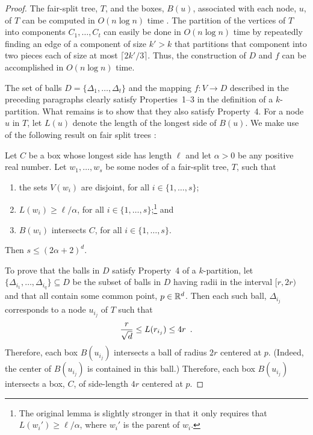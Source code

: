 \documentclass{patmorin}
\begin{document}
\begin{proof}
  The fair-split tree, $T$, and the boxes, $B(u)$, associated
  with each node, $u$, of $T$ can be computed in $O(n\log n)$ time
  \cite{callahan.kosaraju:decomposition}.  The partition of the vertices
  of $T$ into components $C_1,\ldots,C_t$ can easily be done in $O(n\log
  n)$ time by repeatedly finding an edge of a component of size $k'>k$
  that partitions that component into two pieces each of size at most
  $\lceil 2k'/3\rceil$.  Thus, the construction of $D$ and $f$ can be
  accomplished in $O(n\log n)$ time.

  The set of balls $D=\{\Delta_1,\ldots,\Delta_t\}$ and the
  mapping $f:V\to D$ described in the preceding paragraphs clearly
  satisfy Properties~1--3 in the definition of a $k$-partition.
  What remains is to show that they also satisfy Property~4. For a
  node $u$ in $T$, let $L(u)$ denote the length of the longest side
  of $B(u)$.  We make use of the following result on fair split trees
  \cite[Lemma~9.4.3]{narasimhan.smid:geometric}:

  \begin{lem}
     Let $C$ be a box whose longest side has length $\ell$ and let
     $\alpha >0$ be any positive real number.  Let $w_1,\ldots,w_s$
     be some nodes of a fair-split tree, $T$, such that
     \begin{enumerate}
       \item the sets $V(w_i)$ are disjoint, for all $i\in\{1,\ldots,s\}$;
       \item $L(w_i)\ge \ell/\alpha$, for all
          $i\in\{1,\ldots,s\}$;\footnote{The original lemma
          \cite[Lemma~9.4.3]{narasimhan.smid:geometric} is slightly
          stronger in that it only requires that $L(w_i')\ge \ell/\alpha$,
          where $w_i'$ is the parent of $w_i$.} and
       \item $B(w_i)$ intersects $C$, for all $i\in\{1,\ldots,s\}$.
     \end{enumerate}
     Then $s\le (2\alpha + 2)^d$.
  \end{lem}

  To prove that the balls in $D$ satisfy Property~4 of a $k$-partition,
  let $\{\Delta_{i_1},\ldots,\Delta_{i_q}\}\subseteq D$ be the subset of
  balls in $D$ having radii in the interval $[r,2r)$ and that all contain
  some common point, $p\in\mathbb{R}^d$.   Then each such ball, $\Delta_{i_j}$
  corresponds to a node $u_{i_j}$ of $T$ such that
  \begin{equation}
        \frac{r}{\sqrt{d}} \le L(r_{i_j}) \le 4r \enspace . \eqlabel{bounds}
  \end{equation}
  Therefore, each box $B(u_{i_j})$ intersects a ball of radius $2r$
  centered at $p$.  (Indeed, the center of $B(u_{i_j})$ is contained in
  this ball.)  Therefore, each box $B(u_{i_j})$ intersects a box, $C$, of
  side-length $4r$ centered at $p$.  


\end{proof}
\end{document}
